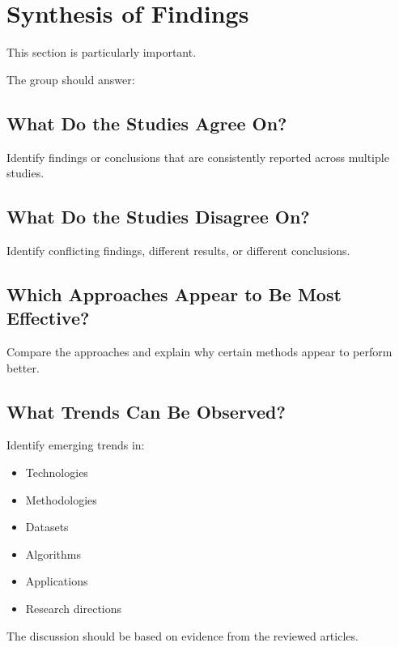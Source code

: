 \documentclass[12pt,a4paper]{article}
\begin{document}

\section{Synthesis of Findings}

This section is particularly important.

The group should answer:


\subsection{What Do the Studies Agree On?}

Identify findings or conclusions that are consistently reported across multiple studies.


\subsection{What Do the Studies Disagree On?}

Identify conflicting findings, different results, or different conclusions.


\subsection{Which Approaches Appear to Be Most Effective?}

Compare the approaches and explain why certain methods appear to perform better.


\subsection{What Trends Can Be Observed?}

Identify emerging trends in:

\begin{itemize}
    \item Technologies
    \item Methodologies
    \item Datasets
    \item Algorithms
    \item Applications
    \item Research directions
\end{itemize}

The discussion should be based on evidence from the reviewed articles.
\end{document}
